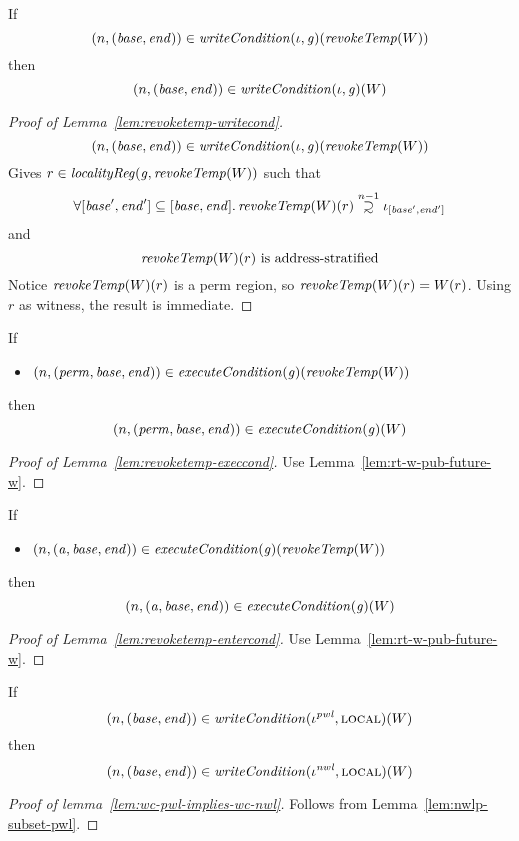 \documentclass[a4paper]{article}
\newcommand\supsetsim{\mathrel{\ooalign{\raise.2ex\hbox{$\supset$}\cr
      \hidewidth\lower.8ex\hbox{\scalebox{0.9}{$\sim$}}\hidewidth\cr}}}
\newcommand{\nsupsim}[1][n]{\stackrel{\tiny{#1}}{\supsetsim}}
\newcommand{\var}[1]{\mathit{#1}}
\newcommand{\gl}{\var{g}}
\newcommand{\addr}{\var{a}}
\newcommand{\start}{\var{base}}
\newcommand{\addrend}{\var{end}}
\newcommand{\perm}{\var{perm}}
\newcommand{\nwl}{\var{nwl}}
\newcommand{\pwl}{\var{pwl}}
\newcommand{\plainfun}[2]{
  \ifthenelse{\equal{#2}{}}
  {\mathit{#1}}
  {\mathit{#1}(#2)}
}
\newcommand{\writeCond}[1]{\plainfun{writeCondition}{#1}}
\newcommand{\execCond}[1]{\plainfun{executeCondition}{#1}}
\newcommand{\revokeTemp}[1]{\plainfun{revokeTemp}{#1}}
\newcommand{\npair}[2][n]{\left(#1,#2 \right)}
\newcommand{\plainperm}[1]{\textsc{#1}}
\newcommand{\local}{\plainperm{local}}
\newcommand{\localityReg}{\var{localityReg}}
\newcommand{\plainview}[1]{\mathrm{#1}}
\newcommand{\perma}{\plainview{perm}}
\begin{document}
\begin{lemma}
  \label{lem:revoketemp-writecond}
  If
  \[
    \npair{(\start,\addrend)} \in \writeCond{}(\iota,\gl)(\revokeTemp{W})
  \]
  then
  \[
    \npair{(\start,\addrend)} \in \writeCond{}(\iota,\gl)(W)
  \]
\end{lemma}
\begin{proof}[Proof of Lemma~\ref{lem:revoketemp-writecond}]
  \[
    \npair{(\start,\addrend)} \in \writeCond{}(\iota,\gl)(\revokeTemp{W})
  \]
  Gives $r \in \localityReg(\gl,\revokeTemp{W})$ such that
  \[
    \forall [\start',\addrend'] \subseteq [\start,\addrend] \ldotp \revokeTemp{W}(r) \nsupsim[n-1] \iota_{[\start',\addrend']}
  \]
  and 
  \begin{equation*}
    \revokeTemp{W}(r) \text{ is address-stratified}
  \end{equation*}
  Notice $\revokeTemp{W}(r)$ is a $\perma$ region, so $\revokeTemp{W}(r) = W(r)$. Using $r$ as witness, the result is immediate.
\end{proof}

\begin{lemma}
  \label{lem:revoketemp-execcond}
  If
  \begin{itemize}
  \item $\npair{(\perm,\start,\addrend)} \in \execCond{}(\gl)(\revokeTemp{W})$
  \end{itemize}
  then
  \[
    \npair{(\perm,\start,\addrend)} \in \execCond{}(\gl)(W)
  \]
\end{lemma}
\begin{proof}[Proof of Lemma~\ref{lem:revoketemp-execcond}]
  Use Lemma~\ref{lem:rt-w-pub-future-w}.
\end{proof}

\begin{lemma}
  \label{lem:revoketemp-entercond}
  If
  \begin{itemize}
  \item $\npair{(\addr,\start,\addrend)} \in \execCond{}(\gl)(\revokeTemp{W})$
  \end{itemize}
  then
  \[
    \npair{(\addr,\start,\addrend)} \in \execCond{}(\gl)(W)
  \]
\end{lemma}
\begin{proof}[Proof of Lemma~\ref{lem:revoketemp-entercond}]
    Use Lemma~\ref{lem:rt-w-pub-future-w}.
\end{proof}

\begin{lemma}
  \label{lem:wc-pwl-implies-wc-nwl}
  If
  \[
    \npair{(\start,\addrend)} \in \writeCond{}(\iota^\pwl,\local)(W)
  \]
  then
  \[
    \npair{(\start,\addrend)} \in \writeCond{}(\iota^\nwl,\local)(W)
  \]
\end{lemma}
\begin{proof}[Proof of lemma~\ref{lem:wc-pwl-implies-wc-nwl}]
  Follows from Lemma~\ref{lem:nwlp-subset-pwl}.
\end{proof}
\end{document}
